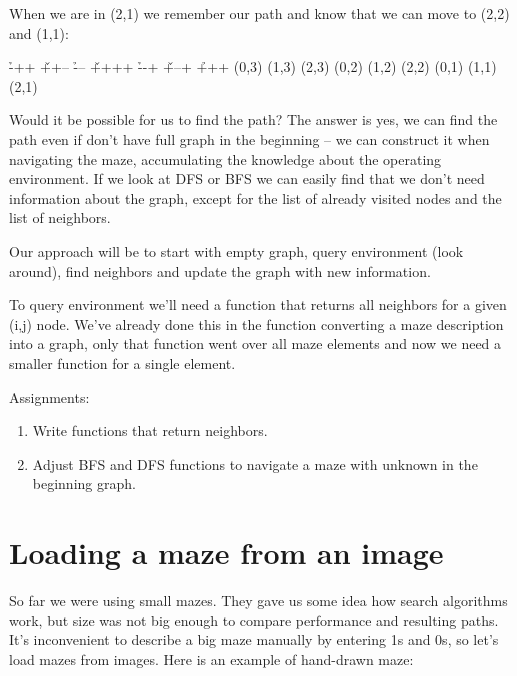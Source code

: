 When we are in (2,1) we remember our path and know that we can 
move to (2,2) and (1,1):

\begin{labyrinth}{3}{4}
        \h -++
\v ++-- \h ---
\v ++++ \h --+
\v +--+ \h +++
\putsymbol(0,3){}
\putsymbol(1,3){}
\putsymbol(2,3){}
\putsymbol(0,2){}
\putsymbol(1,2){}
\putsymbol(2,2){}
\putsymbol(0,1){}
\putsymbol(1,1){}
\putsymbol(2,1){}
\end{labyrinth}


Would it be possible for us to find the path? The answer
is yes, we can find the path even if don't have full graph
in the beginning -- we can construct it when navigating the
maze, accumulating the knowledge about the operating environment.
If we look at DFS or BFS we can easily find that we don't
need information about the graph, except for the list of
already visited nodes and the list of neighbors.

Our approach will be to start with empty graph,
query environment (look around),
find neighbors and update the graph with new information.

To query environment we'll need a function that returns
all neighbors for a given (i,j) node. We've already done
this in the function converting a maze description into
a graph, only that function went over all maze elements
and now we need a smaller function for a single element.

\begin{tcolorbox}
Assignments:
\begin{enumerate}
\item Write functions that return neighbors.
\item Adjust BFS and DFS functions to navigate a maze
with unknown in the beginning graph.
\end{enumerate}
\end{tcolorbox}

\section{Loading a maze from an image}

So far we were using small mazes. They gave us some idea
how search algorithms work, but size was not big enough
to compare performance and resulting paths. It's inconvenient
to describe a big maze manually by entering 1s and 0s, so
let's load mazes from images. Here is an example of hand-drawn
maze:

